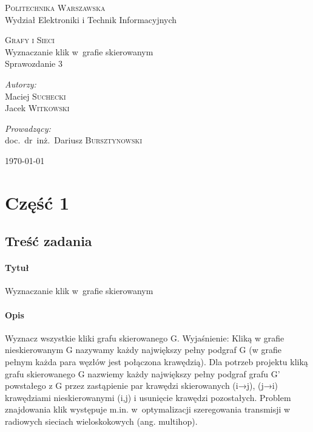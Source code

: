 \documentclass[11pt,a4paper]{article}
\begin{document}
\begin{titlepage}
  \begin{center}

    \textsc{\Large Politechnika Warszawska}\\[0.1cm]
    \small Wydział Elektroniki i Technik Informacyjnych
    \vfill

    \textsc{\small Grafy i Sieci}\\[0.1cm]
    \Huge Wyznaczanie klik w~grafie skierowanym\\[1.5cm]
    \small Sprawozdanie 3\\[2.5cm]

    \vfill

    \begin{minipage}{0.4\textwidth}
      \begin{flushleft} \large
        \emph{Autorzy:}\\[0.1cm]
        Maciej \textsc{Suchecki}\\
        Jacek \textsc{Witkowski}\\
      \end{flushleft}
    \end{minipage}
    \begin{minipage}{0.4\textwidth}
      \begin{flushright} \large
        \emph{Prowadzący:}\\[0.1cm]
        doc.~dr~inż.~Dariusz \textsc{Bursztynowski}\\[1cm]
      \end{flushright}
    \end{minipage}

    \vfill
    {\large \today}

  \end{center}
\end{titlepage}

\section{Część 1}
\subsection{Treść zadania}
\paragraph{Tytuł} Wyznaczanie klik w~grafie skierowanym
\paragraph{Opis} Wyznacz wszystkie kliki grafu skierowanego G. Wyjaśnienie: Kliką w grafie nieskierowanym G nazywamy każdy największy pełny podgraf G (w grafie pełnym każda para węzłów jest połączona krawędzią). Dla potrzeb projektu kliką grafu skierowanego G nazwiemy każdy największy pełny podgraf grafu G’ powstałego z G przez zastąpienie par krawędzi skierowanych (i→j), (j→i) krawędziami nieskierowanymi (i,j) i usunięcie krawędzi pozostałych. Problem znajdowania klik występuje m.in. w~optymalizacji szeregowania transmisji w radiowych sieciach wieloskokowych (ang. multihop).
\end{document}
